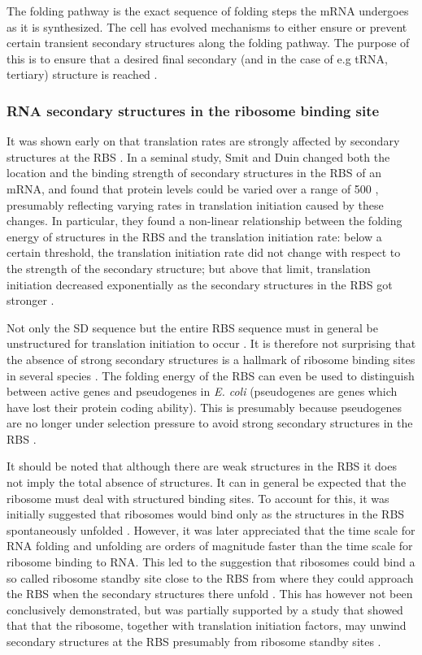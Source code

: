The folding pathway is the exact sequence of folding steps the mRNA undergoes
as it is synthesized. The cell has evolved mechanisms to either ensure or
prevent certain transient secondary structures along the folding pathway. The
purpose of this is to ensure that a desired final secondary (and in the case of
e.g tRNA, tertiary) structure is reached \cite{pan_rna_2006}.

\subsubsection{RNA secondary structures in the ribosome binding site}
It was shown early on that translation rates are strongly affected by secondary
structures at the RBS \cite{hall_role_1982}. In a seminal study, Smit and Duin
changed both the location and the binding strength of secondary structures in
the RBS of an mRNA, and found that protein levels could be varied over a range
of 500 \cite{de_smit_secondary_1990}, presumably reflecting varying rates in
translation initiation caused by these changes. In particular, they found a
non-linear relationship between the folding energy of structures in the RBS and
the translation initiation rate: below a certain threshold, the translation
initiation rate did not change with respect to the strength of the secondary
structure; but above that limit, translation initiation decreased exponentially
as the secondary structures in the RBS got stronger
\cite{de_smit_secondary_1990}.

Not only the SD sequence but the entire RBS sequence must in general be
unstructured for translation initiation to occur \cite{seo_quantitative_2009}.
It is therefore not surprising that the absence of strong secondary structures
is a hallmark of ribosome binding sites in several species
\cite{gu_universal_2010}. The folding energy of the RBS can even be used to
distinguish between active genes and pseudogenes in \textit{E.  coli}
(pseudogenes are genes which have lost their protein coding ability). This is
presumably because pseudogenes are no longer under selection pressure to avoid
strong secondary structures in the RBS \cite{keller_reduced_2012}.

It should be noted that although there are weak structures in the RBS it does
not imply the total absence of structures. It can in general be expected that
the ribosome must deal with structured binding sites. To account for this, it
was initially suggested that ribosomes would bind only as the structures in the
RBS spontaneously unfolded \cite{de_smit_translational_1994}. However, it was
later appreciated that the time scale for RNA folding and unfolding are orders
of magnitude faster than the time scale for ribosome binding to RNA. This led
to the suggestion that ribosomes could bind a so called ribosome standby site
close to the RBS from where they could approach the RBS when the secondary
structures there unfold \cite{de_smit_translational_2003}. This has however
not been conclusively demonstrated, but was partially supported by a study that
showed that that the ribosome, together with translation initiation factors,
may unwind secondary structures at the RBS presumably from ribosome standby
sites \cite{studer_unfolding_2006}.

